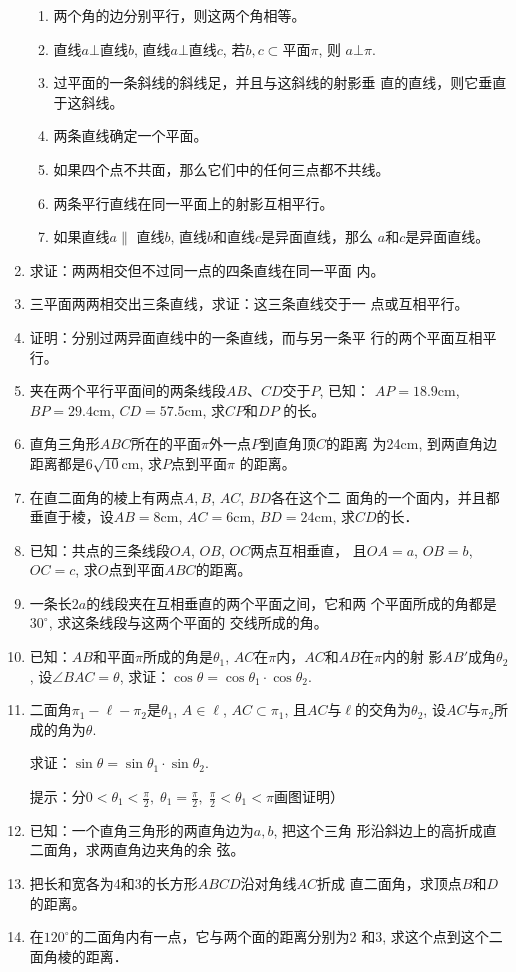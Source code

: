 \begin{enumerate}
\begin{enumerate}[(1)]
\item 两个角的边分别平行，则这两个角相等。
\item 直线$a\bot $直线$b$, 直线$a\bot $直线$c$, 若$b,c\subset $平面$\pi$, 则
$a\bot \pi$.
\item 过平面的一条斜线的斜线足，并且与这斜线的射影垂
直的直线，则它垂直于这斜线。
\item 两条直线确定一个平面。
\item 如果四个点不共面，那么它们中的任何三点都不共线。
\item 两条平行直线在同一平面上的射影互相平行。
\item 如果直线$a\parallel$ 直线$b$, 直线$b$和直线$c$是异面直线，那么
$a$和$c$是异面直线。
\end{enumerate}

\item 求证：两两相交但不过同一点的四条直线在同一平面
内。
\item 三平面两两相交出三条直线，求证：这三条直线交于一
点或互相平行。
\item 证明：分别过两异面直线中的一条直线，而与另一条平
行的两个平面互相平行。
\item 夹在两个平行平面间的两条线段$AB$、$CD$交于$P$, 已知：
$AP=18.9$cm, $BP=29.4$cm, $CD=57.5$cm, 求$CP$和$DP$
的长。
\item 直角三角形$ABC$所在的平面$\pi$外一点$P$到直角顶$C$的距离
为24cm, 到两直角边距离都是$6\sqrt{10}$cm, 求$P$点到平面$\pi$
的距离。
\item 在直二面角的棱上有两点$A,B$, $AC$, $BD$各在这个二
面角的一个面内，并且都垂直于棱，设$AB=8$cm, $AC
=6$cm, $BD=24$cm, 求$CD$的长．
\item 已知：共点的三条线段$OA$, $OB$, $OC$两点互相垂直，
且$OA=a$, $OB=b$, $OC=c$, 求$O$点到平面$ABC$的距离。
\item 一条长$2a$的线段夹在互相垂直的两个平面之间，它和两
个平面所成的角都是$30^{\circ}$, 求这条线段与这两个平面的
交线所成的角。

\item 已知：$AB$和平面$\pi$所成的角是$\theta_1$, 
$AC$在$\pi$内，$AC$和$AB$在$\pi$内的射
影$AB'$成角$\theta_2$, 设$\angle BAC=\theta$, 
求证：$\cos\theta=\cos\theta_1\cdot \cos\theta_2$.
\item 二面角$\pi_1-\ell-\pi_2$是$\theta_1$, $A\in\ell$, 
$AC\subset \pi_1$, 且$AC$与$\ell$的交角为$\theta_2$, 
设$AC$与$\pi_2$所成的角为$\theta$.

求证：$\sin\theta=\sin\theta_1\cdot \sin\theta_2$.

提示：分$0<\theta_1<\frac{\pi}{2},\; \theta_1=\frac{\pi}{2},\; \frac{\pi}{2}<\theta_1<\pi$画图证明）
\item 已知：一个直角三角形的两直角边为$a,b$, 把这个三角
形沿斜边上的高折成直二面角，求两直角边夹角的余
弦。
\item 把长和宽各为4和3的长方形$ABCD$沿对角线$AC$折成
直二面角，求顶点$B$和$D$的距离。
\item 在$120^{\circ}$的二面角内有一点，它与两个面的距离分别为2
和3, 求这个点到这个二面角棱的距离．


\end{enumerate}
